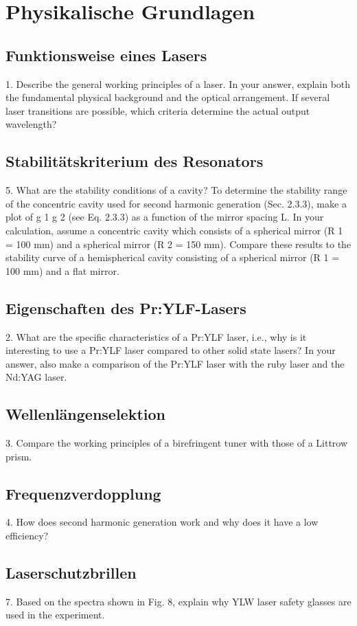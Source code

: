 \section{Physikalische Grundlagen}

\subsection{Funktionsweise eines Lasers}

1. Describe the general working principles of a laser. In your answer, explain both the fundamental
physical background and the optical arrangement. If several laser transitions are possible, which
criteria determine the actual output wavelength?

\subsection{Stabilitätskriterium des Resonators}

5. What are the stability conditions of a cavity? To determine the stability range of the concentric
cavity used for second harmonic generation (Sec. 2.3.3), make a plot of g 1 g 2 (see Eq. 2.3.3) as a
function of the mirror spacing L. In your calculation, assume a concentric cavity which consists of
a spherical mirror (R 1 = 100 mm) and a spherical mirror (R 2 = 150 mm). Compare these results
to the stability curve of a hemispherical cavity consisting of a spherical mirror (R 1 = 100 mm) and
a flat mirror.



\subsection{Eigenschaften des Pr:YLF-Lasers}

2. What are the specific characteristics of a Pr:YLF laser, i.e., why is it interesting to use a Pr:YLF
laser compared to other solid state lasers? In your answer, also make a comparison of the Pr:YLF
laser with the ruby laser and the Nd:YAG laser.


\subsection{Wellenlängenselektion}


3. Compare the working principles of a birefringent tuner with those of a Littrow prism.


\subsection{Frequenzverdopplung}

4. How does second harmonic generation work and why does it have a low
efficiency?



\subsection{Laserschutzbrillen}


7. Based on the spectra shown in Fig. 8, explain why YLW laser safety glasses are used in the
experiment.